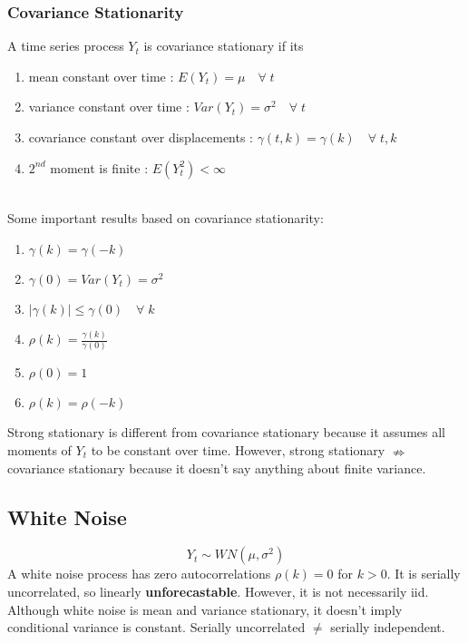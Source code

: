 \documentclass{article}
\begin{document}
\subsubsection{Covariance Stationarity}
A time series process $Y_t$ is covariance stationary if its
\begin{enumerate}
    \item mean constant over time : $E(Y_t) = \mu \quad \forall \; t$
    \item variance constant over time : $Var(Y_t) = \sigma^2 \quad \forall \; t$
    \item covariance constant over displacements : $\gamma(t,k) = \gamma(k) \quad \forall \; t,k$
    \item $2^{nd}$ moment is finite : $E(Y_t^2) < \infty$
\end{enumerate}
\\
Some important results based on covariance stationarity:
\begin{enumerate}
    \item $\gamma(k) = \gamma(-k)$
    \item $\gamma(0) = Var(Y_t) = \sigma^2$
    \item $|\gamma(k)| \leq \gamma(0) \quad \forall \; k$
    \item $\rho(k) = \frac{\gamma(k)}{\gamma(0)}$
    \item $\rho(0) = 1$
    \item $\rho(k) = \rho(-k)$
\end{enumerate}
Strong stationary is different from covariance stationary because it assumes all moments of $Y_t$ to be constant over time. However, strong stationary $\nRightarrow$ covariance stationary because it doesn't say anything about finite variance.

\subsection{White Noise}
$$Y_t \sim WN(\mu, \sigma^2)$$
A white noise process has zero autocorrelations $\rho(k) = 0$ for $k > 0$. It is serially uncorrelated, so linearly \textbf{unforecastable}. However, it is not necessarily iid. Although white noise is mean and variance stationary, it doesn't imply conditional variance is constant. Serially uncorrelated $\neq$ serially independent.
\end{document}
